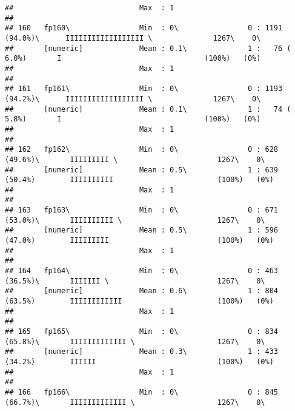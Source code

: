 \documentclass[]{article}
\begin{document}
\begin{verbatim}
##                             Max  : 1                                                                                            
## 
## 160   fp160\                Min  : 0\                0 : 1191 (94.0%)\      IIIIIIIIIIIIIIIIII \              1267\    0\       
##       [numeric]             Mean : 0.1\              1 :   76 ( 6.0%)       I                                 (100%)   (0%)     
##                             Max  : 1                                                                                            
## 
## 161   fp161\                Min  : 0\                0 : 1193 (94.2%)\      IIIIIIIIIIIIIIIIII \              1267\    0\       
##       [numeric]             Mean : 0.1\              1 :   74 ( 5.8%)       I                                 (100%)   (0%)     
##                             Max  : 1                                                                                            
## 
## 162   fp162\                Min  : 0\                0 : 628 (49.6%)\       IIIIIIIII \                       1267\    0\       
##       [numeric]             Mean : 0.5\              1 : 639 (50.4%)        IIIIIIIIII                        (100%)   (0%)     
##                             Max  : 1                                                                                            
## 
## 163   fp163\                Min  : 0\                0 : 671 (53.0%)\       IIIIIIIIII \                      1267\    0\       
##       [numeric]             Mean : 0.5\              1 : 596 (47.0%)        IIIIIIIII                         (100%)   (0%)     
##                             Max  : 1                                                                                            
## 
## 164   fp164\                Min  : 0\                0 : 463 (36.5%)\       IIIIIII \                         1267\    0\       
##       [numeric]             Mean : 0.6\              1 : 804 (63.5%)        IIIIIIIIIIII                      (100%)   (0%)     
##                             Max  : 1                                                                                            
## 
## 165   fp165\                Min  : 0\                0 : 834 (65.8%)\       IIIIIIIIIIIII \                   1267\    0\       
##       [numeric]             Mean : 0.3\              1 : 433 (34.2%)        IIIIII                            (100%)   (0%)     
##                             Max  : 1                                                                                            
## 
## 166   fp166\                Min  : 0\                0 : 845 (66.7%)\       IIIIIIIIIIIII \                   1267\    0\       

\end{verbatim}
\end{document}
